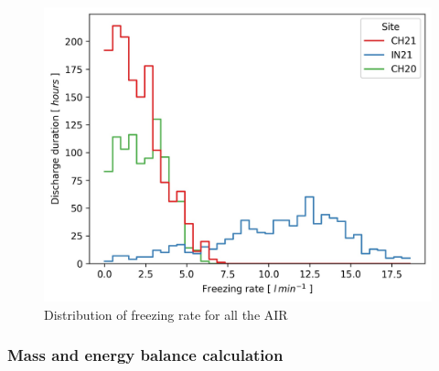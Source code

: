 \documentclass[utf8]{frontiersSCNS} %
\begin{document}
\begin{figure} \begin{center} \includegraphics[width=\linewidth]{Figures/freeze_rate.jpg} \end{center}
\caption{ Distribution of freezing rate for all the AIR } \label{fig:freeze_rate} \end{figure}



\subsubsection{Mass and energy balance calculation}
\end{document}
